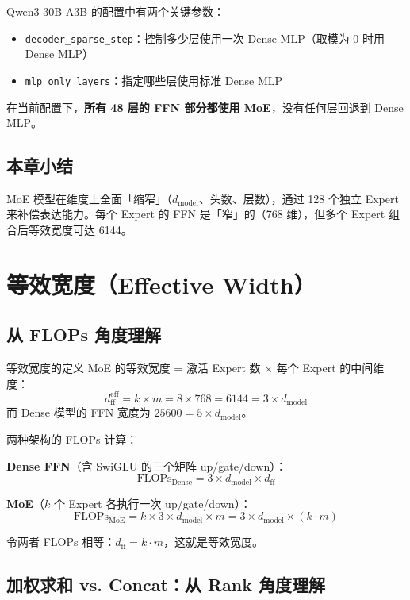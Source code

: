 \documentclass[a4paper]{article}
\begin{document}
Qwen3-30B-A3B 的配置中有两个关键参数：
\begin{itemize}
  \item \texttt{decoder\_sparse\_step}：控制多少层使用一次 Dense MLP（取模为 0 时用 Dense MLP）
  \item \texttt{mlp\_only\_layers}：指定哪些层使用标准 Dense MLP
\end{itemize}

在当前配置下，\textbf{所有 48 层的 FFN 部分都使用 MoE}，没有任何层回退到 Dense MLP。

\subsection{本章小结}

MoE 模型在维度上全面「缩窄」（$d_{\text{model}}$、头数、层数），通过 128 个独立 Expert 来补偿表达能力。每个 Expert 的 FFN 是「窄」的（768 维），但多个 Expert 组合后等效宽度可达 6144。

\section{等效宽度（Effective Width）}

\subsection{从 FLOPs 角度理解}

\begin{importantbox}{等效宽度的定义}
MoE 的等效宽度 = 激活 Expert 数 $\times$ 每个 Expert 的中间维度：
$$
d_{\text{ff}}^{\text{eff}} = k \times m = 8 \times 768 = 6144 = 3 \times d_{\text{model}}
$$
而 Dense 模型的 FFN 宽度为 $25600 = 5 \times d_{\text{model}}$。
\end{importantbox}

两种架构的 FLOPs 计算：

\textbf{Dense FFN}（含 SwiGLU 的三个矩阵 up/gate/down）：
$$
\text{FLOPs}_{\text{Dense}} = 3 \times d_{\text{model}} \times d_{\text{ff}}
$$

\textbf{MoE}（$k$ 个 Expert 各执行一次 up/gate/down）：
$$
\text{FLOPs}_{\text{MoE}} = k \times 3 \times d_{\text{model}} \times m = 3 \times d_{\text{model}} \times (k \cdot m)
$$

令两者 FLOPs 相等：$d_{\text{ff}} = k \cdot m$，这就是等效宽度。

\subsection{加权求和 vs. Concat：从 Rank 角度理解}
\end{document}
